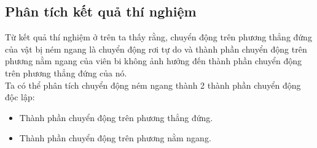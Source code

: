 \subsection{Phân tích kết quả thí nghiệm}
Từ kết quả thí nghiệm ở trên ta thấy rằng, chuyển động trên phương thẳng đứng của vật bị ném ngang là chuyển động rơi tự do và thành phần chuyển động trên phương nằm ngang của viên bi không ảnh hưởng đến thành phần chuyển động trên phương thẳng đứng của nó.\\
Ta có thể phân tích chuyển động ném ngang thành 2 thành phần chuyển động độc lập:
\begin{itemize}
	\item Thành phần chuyển động trên phương thẳng đứng.
	\item Thành phần chuyển động trên phương nằm ngang.
\end{itemize}
